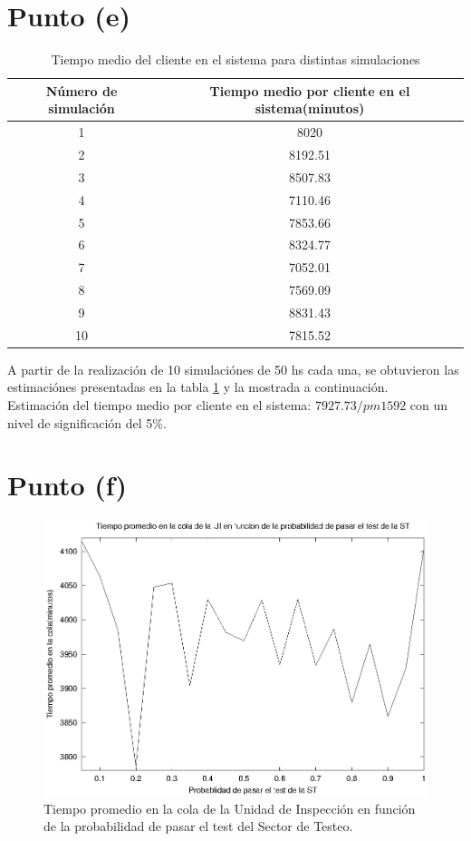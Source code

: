 \documentclass[a4paper,10pt]{article}
\begin{document}
\section{Punto (e)}

\begin{table}
\centering
\begin{tabular}{|c|c|}
\hline
  N\'umero de simulaci\'on & Tiempo medio por cliente en el sistema(minutos) \\
\hline
  1 & 8020 \\
\hline
  2 & 8192.51 \\
\hline
  3 & 8507.83 \\
\hline
  4 & 7110.46 \\
\hline
  5 & 7853.66 \\
\hline
  6 & 8324.77 \\
\hline
  7 & 7052.01 \\
\hline
  8 & 7569.09 \\
\hline
  9 & 8831.43 \\
\hline
  10 & 7815.52 \\
\hline
\end{tabular}
\caption{\label{tab:mean_sistem_time} Tiempo medio del cliente en el sistema para distintas simulaciones}
\end{table} 
A partir de la realización de 10 simulaciónes de 50 hs cada una, se obtuvieron las estimaciónes presentadas en la tabla \ref{tab:mean_sistem_time} y la mostrada a continuación.\\
Estimaci\'on del tiempo medio por cliente en el sistema: $7927.73 /pm 1592$ con un nivel de significaci\'on del 5\%.


\section{Punto (f)}

\begin{figure}[ht]
\begin{center}
\includegraphics[width=15cm]{./img/tp_UI.eps}
\caption{\label{fig:tp_UI} Tiempo promedio en la cola de la Unidad de Inspecci\'on en funci\'on de la probabilidad de pasar el test del Sector de Testeo.}
\end{center}
\end{figure}
\end{document}
